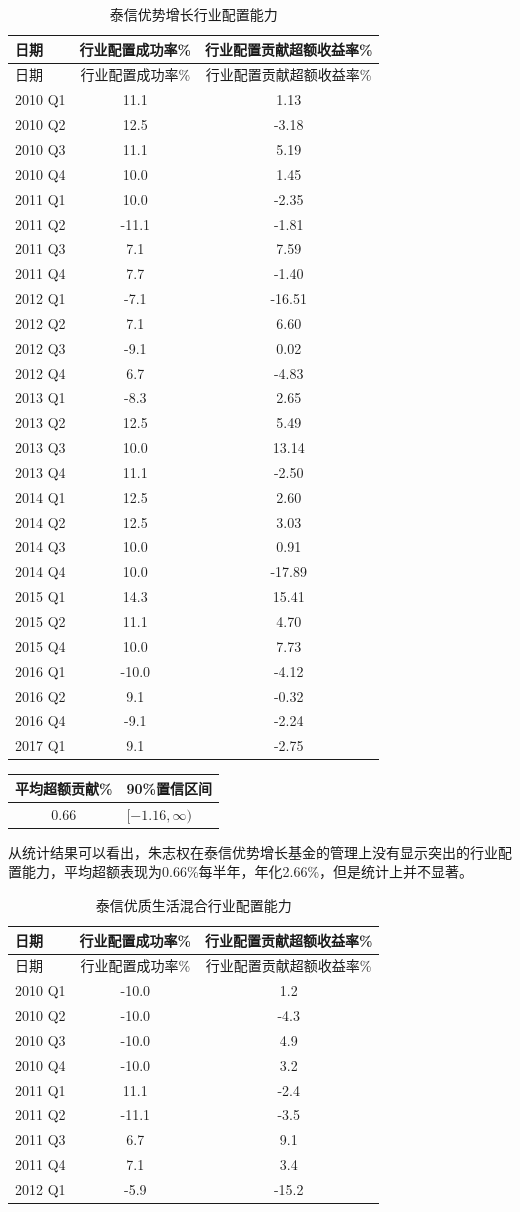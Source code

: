 \documentclass[hyperref,]{ctexart}
\begin{document}
\begin{longtable}[]{@{}lcc@{}}
\caption{泰信优势增长行业配置能力}\tabularnewline
\toprule
日期 & 行业配置成功率\% & 行业配置贡献超额收益率\%\tabularnewline
\midrule
\endfirsthead
\toprule
日期 & 行业配置成功率\% & 行业配置贡献超额收益率\%\tabularnewline
\midrule
\endhead
2010 Q1 & 11.1 & 1.13\tabularnewline
2010 Q2 & 12.5 & -3.18\tabularnewline
2010 Q3 & 11.1 & 5.19\tabularnewline
2010 Q4 & 10.0 & 1.45\tabularnewline
2011 Q1 & 10.0 & -2.35\tabularnewline
2011 Q2 & -11.1 & -1.81\tabularnewline
2011 Q3 & 7.1 & 7.59\tabularnewline
2011 Q4 & 7.7 & -1.40\tabularnewline
2012 Q1 & -7.1 & -16.51\tabularnewline
2012 Q2 & 7.1 & 6.60\tabularnewline
2012 Q3 & -9.1 & 0.02\tabularnewline
2012 Q4 & 6.7 & -4.83\tabularnewline
2013 Q1 & -8.3 & 2.65\tabularnewline
2013 Q2 & 12.5 & 5.49\tabularnewline
2013 Q3 & 10.0 & 13.14\tabularnewline
2013 Q4 & 11.1 & -2.50\tabularnewline
2014 Q1 & 12.5 & 2.60\tabularnewline
2014 Q2 & 12.5 & 3.03\tabularnewline
2014 Q3 & 10.0 & 0.91\tabularnewline
2014 Q4 & 10.0 & -17.89\tabularnewline
2015 Q1 & 14.3 & 15.41\tabularnewline
2015 Q2 & 11.1 & 4.70\tabularnewline
2015 Q4 & 10.0 & 7.73\tabularnewline
2016 Q1 & -10.0 & -4.12\tabularnewline
2016 Q2 & 9.1 & -0.32\tabularnewline
2016 Q4 & -9.1 & -2.24\tabularnewline
2017 Q1 & 9.1 & -2.75\tabularnewline
\bottomrule
\end{longtable}

\begin{longtable}[]{@{}cl@{}}
\toprule
平均超额贡献\% & 90\%置信区间\tabularnewline
\midrule
\endhead
0.66 & \([-1.16,\infty)\)\tabularnewline
\bottomrule
\end{longtable}

从统计结果可以看出，朱志权在泰信优势增长基金的管理上没有显示突出的行业配置能力，平均超额表现为0.66\%每半年，年化2.66\%，但是统计上并不显著。

\begin{longtable}[]{@{}lcc@{}}
\caption{泰信优质生活混合行业配置能力}\tabularnewline
\toprule
日期 & 行业配置成功率\% & 行业配置贡献超额收益率\%\tabularnewline
\midrule
\endfirsthead
\toprule
日期 & 行业配置成功率\% & 行业配置贡献超额收益率\%\tabularnewline
\midrule
\endhead
2010 Q1 & -10.0 & 1.2\tabularnewline
2010 Q2 & -10.0 & -4.3\tabularnewline
2010 Q3 & -10.0 & 4.9\tabularnewline
2010 Q4 & -10.0 & 3.2\tabularnewline
2011 Q1 & 11.1 & -2.4\tabularnewline
2011 Q2 & -11.1 & -3.5\tabularnewline
2011 Q3 & 6.7 & 9.1\tabularnewline
2011 Q4 & 7.1 & 3.4\tabularnewline
2012 Q1 & -5.9 & -15.2\tabularnewline
\bottomrule
\end{longtable}
\end{document}
